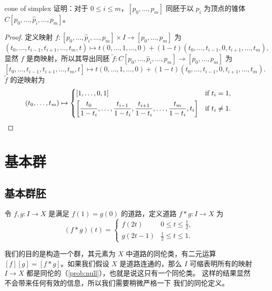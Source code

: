 \documentclass[fontset=none]{Notes}
\begin{document}
\begin{problem}{}{cone of simplex}
  证明：对于 $0\leq i\leq m$，$[p_0,\dots,p_m]$ 同胚于以 $p_i$
  为顶点的锥体 $C[p_0,\dots,\hat p_i,\dots,p_m]$。
\end{problem}
\begin{proof}
  定义映射 $f:[p_0,\dots,\hat p_i,\dots,p_m]\times I\to [p_0,\dots,p_m]$ 为
  \[
    \left(t_0,\dots,t_{i-1},t_{i+1},\dots,t_m,t\right)
    \mapsto t(0,\dots,1,\dots,0)+(1-t)\left(t_0,\dots,t_{i-1},0,t_{i+1},\dots,t_m\right),
  \]
  显然 $f$ 是商映射，所以其导出同胚 $\tilde f:C[p_0,\dots,\hat p_i,\dots,p_m]\to [p_0,\dots,p_m]$
  为
  \[
    [t_0,\dots,t_{i-1},t_{i+1},\dots,t_m,t]\mapsto 
    t(0,\dots,1,\dots,0)+(1-t)\left(t_0,\dots,t_{i-1},0,t_{i+1},\dots,t_m\right).
  \]
  $\tilde f$ 的逆映射为
  \[
    (t_0,\dots,t_m)\mapsto
    \begin{dcases}
      [1,\dots,0,1]
      &\text{if $t_i=1$},
      \\
      \left[
        \frac{t_0}{1-t_i},\dots,\frac{t_{i-1}}{1-t_i},\frac{t_{i+1}}{1-t_i},
        \dots,\frac{t_m}{1-t_i},t_i
      \right] & \text{if $t_i\neq 1$}.
    \end{dcases}\qedhere
  \]
\end{proof}



\chapter{基本群}

\section{基本群胚}

\begin{definition}
  令 $f,g:I\to X$ 是满足 $f(1)=g(0)$ 的道路，定义道路 $f*g:I\to X$
  为
  \[
    (f*g)(t)=\begin{cases}
      f(2t) & 0\leq t\leq\frac{1}{2},\\
      g(2t-1) & \frac{1}{2}\leq t\leq 1.
    \end{cases}
  \]
\end{definition}

我们的目的是构造一个群，其元素为 $X$ 中道路的同伦类，有二元运算
$[f][g]=[f*g]$。如果我们假设 $X$ 是道路连通的，那么 $I$ 可缩表明所有的映射
$I\to X$ 都是同伦的（\ref{prob:null}），也就是说这只有一个同伦类。
这样的结果显然不会带来任何有效的信息，所以我们需要稍微严格一下
我们的同伦定义。
\end{document}
